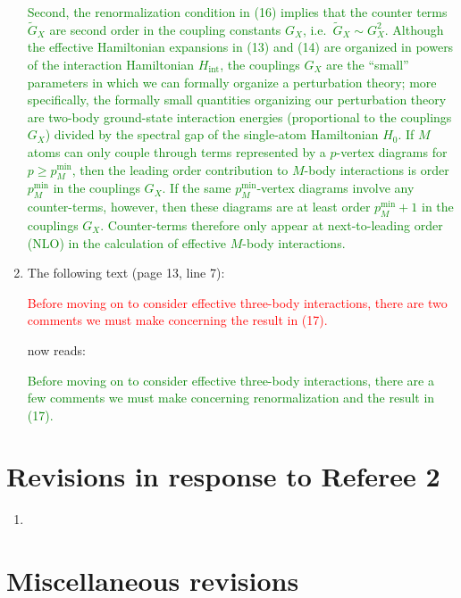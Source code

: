 \documentclass[preprint]{revtex4-1}
\renewcommand{\t}{\text} %
\newcommand{\1}{\mathds{1}}
\newcommand{\red}[1]{\textcolor{red}{#1}}
\newcommand{\green}[1]{\textcolor{green}{#1}}
\newcounter{point}
\begin{document}
\begin{enumerate}[label=(R1.\arabic{point}.\arabic*)]
  \green{Second, the renormalization condition in (16) implies that
    the counter terms $\tilde G_X$ are second order in the coupling
    constants $G_X$, i.e.~$\tilde G_X\sim G_X^2$.  Although the
    effective Hamiltonian expansions in (13) and (14) are organized in
    powers of the interaction Hamiltonian $H_{\t{int}}$, the couplings
    $G_X$ are the ``small'' parameters in which we can formally
    organize a perturbation theory; more specifically, the formally
    small quantities organizing our perturbation theory are two-body
    ground-state interaction energies (proportional to the couplings
    $G_X$) divided by the spectral gap of the single-atom Hamiltonian
    $H_0$.  If $M$ atoms can only couple through terms represented by
    a $p$-vertex diagrams for $p\ge p_M^{\t{min}}$, then the leading
    order contribution to $M$-body interactions is order
    $p_M^{\t{min}}$ in the couplings $G_X$.  If the same
    $p_M^{\t{min}}$-vertex diagrams involve any counter-terms,
    however, then these diagrams are at least order $p_M^{\t{min}}+1$
    in the couplings $G_X$.  Counter-terms therefore only appear at
    next-to-leading order (NLO) in the calculation of effective
    $M$-body interactions.}


\item The following text (page 13, line 7):

  \red{Before moving on to consider effective three-body interactions,
    there are two comments we must make concerning the result in
    (17).}

  now reads:

  \green{Before moving on to consider effective three-body
    interactions, there are a few comments we must make concerning
    renormalization and the result in (17).}

\end{enumerate}


\section*{Revisions in response to Referee 2}

\setcounter{point}{1}
\begin{enumerate}[label=(R2.\arabic{point}.\arabic*)]
\item
\end{enumerate}


\section*{Miscellaneous revisions}
\end{document}
